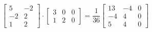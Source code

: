 \begin{solution}
\[\begin{bmatrix}
            5 & -2 \\
            -2 & 2\\
            1 & 2
        \end{bmatrix} \cdot \begin{bmatrix}
            3 & 0 & 0\\
            1 & 2 & 0
        \end{bmatrix} = \dfrac{1}{36} \begin{bmatrix}
            13 & -4 & 0\\
            -4 & 4 & 0\\
            5 & 4 & 0
        \end{bmatrix}
    \]
\end{solution}